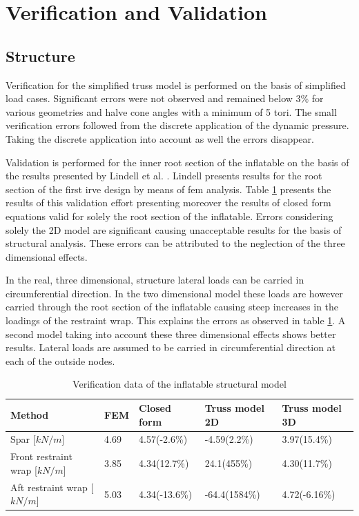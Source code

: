 \section{Verification and Validation}

\subsection{Structure} \label{sec:VandVstruc}


Verification for the simplified truss model is performed on the basis of simplified load cases. Significant errors were not observed and remained below 3\% for various geometries and halve cone angles with a minimum of 5 tori. The small verification errors followed from the discrete application of the dynamic pressure. Taking the discrete application into account as well the errors disappear.

Validation is performed for the inner root section of the inflatable on the basis of the results presented by Lindell et al. \cite{Lindell2006}. Lindell presents results for the root section of the first \gls{irve} design by means of \gls{fem} analysis. Table \ref{tab:struc_val} presents the results of this validation effort presenting moreover the results of closed form equations valid for solely the root section of the inflatable. Errors considering solely the 2D model are significant causing unacceptable results for the basis of structural analysis. These errors can be attributed to the neglection of the three dimensional effects. 

In the real, three dimensional, structure lateral loads can be carried in circumferential direction. In the two dimensional model these loads are however carried through the root section of the inflatable causing steep increases in the loadings of the restraint wrap. This explains the errors as observed in table \ref{tab:struc_val}. A second model taking into account these three dimensional effects shows better results. Lateral loads are assumed to be carried in circumferential direction at each of the outside nodes. 

\begin{table}[h]
\centering
\caption{Verification data of the inflatable structural model}
\label{tab:struc_val} 
\begin{tabular}{|l|l|l|l|l|} \hline
Method                            & FEM \cite{Lindell2006} & Closed form \cite{Lindell2006} & Truss model 2D & Truss model 3D \\ \hline \hline
Spar [$kN/m$]                 & 4.69                     & 4.57(-2.6\%)                     & -4.59(2.2\%)   & 3.97(15.4\%)   \\ \hline
Front restraint wrap [$kN/m$] & 3.85                     & 4.34(12.7\%)                     & 24.1(455\%)    & 4.30(11.7\%)   \\ \hline
Aft restraint wrap [$kN/m$]   & 5.03                     & 4.34(-13.6\%)                    & -64.4(1584\%)  & 4.72(-6.16\%) \\ \hline
\end{tabular}
\end{table}

